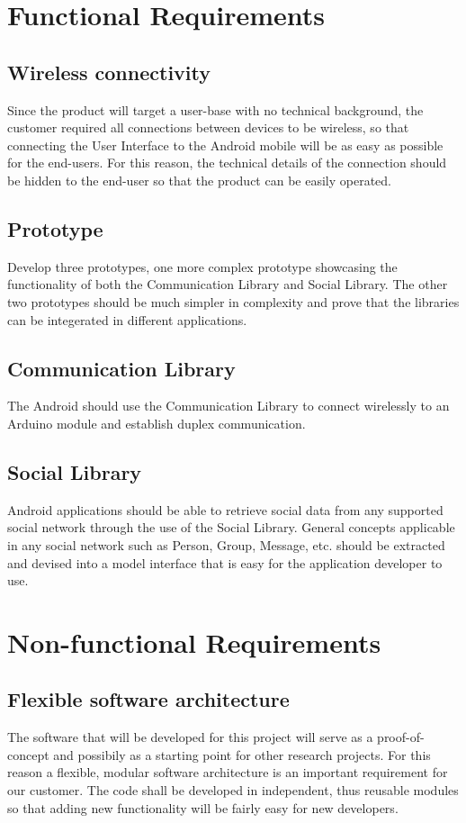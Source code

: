 \section{Functional Requirements}

\subsection{Wireless connectivity}
Since the product will target a user-base with no technical background,
the customer required all connections between devices to be wireless,
so that connecting the User Interface to the Android mobile will be
as easy as possible for the end-users. For this reason, the technical
details of the connection should be hidden to the end-user so that
the product can be easily operated.

\subsection{Prototype}
Develop three prototypes, one more complex prototype showcasing the 
functionality of both the Communication Library and Social Library. The other
two prototypes should be much simpler in complexity and prove that the 
libraries can be integerated in different applications.

\subsection{Communication Library}
The Android should use the Communication Library to connect wirelessly 
to an Arduino module and establish duplex communication.

\subsection{Social Library}
Android applications should be able to retrieve social data from any 
supported social network through the use of the Social Library. General 
concepts applicable in any social network such as Person, Group, Message, etc.
should be extracted and devised into a model interface that is easy for the application
developer to use.


\section{Non-functional Requirements}

\subsection{Flexible software architecture}
The software that will be developed for this project will serve as
a proof-of-concept and possibily as a starting point for other research
projects. For this reason a flexible, modular software architecture
is an important requirement for our customer. The code shall be developed
in independent, thus reusable modules so that adding new functionality
will be fairly easy for new developers.

